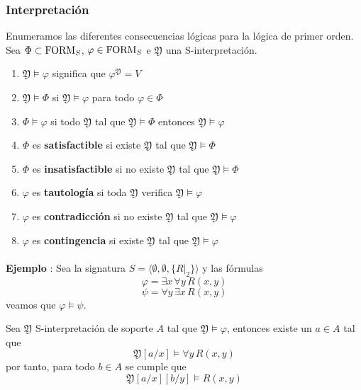\subsubsection{Interpretación}
\begin{definition}
Enumeramos las diferentes consecuencias lógicas para la lógica de primer orden. Sea $\Phi \subset \mbox{FORM}_{S}$, $\varphi \in \mbox{FORM}_{S}$ e $\mathfrak{Y}$ una S-interpretación. 
\begin{enumerate}
	\item $\mathfrak{Y} \models \varphi$ significa que $\varphi^{\mathfrak{Y}}=V$
	\item $\mathfrak{Y} \models \Phi$ si $\mathfrak{Y} \models \varphi$ para todo $\varphi \in \Phi$
	\item $\Phi \models \varphi$ si todo $\mathfrak{Y}$ tal que $\mathfrak{Y} \models \Phi$ entonces $\mathfrak{Y} \models \varphi$
	\item $\Phi$ es \textbf{satisfactible} si existe $\mathfrak{Y}$ tal que $\mathfrak{Y} \models \Phi$
    \item $\Phi$ es \textbf{insatisfactible} si no existe $\mathfrak{Y}$ tal que $\mathfrak{Y} \models \Phi$
    \item $\varphi$ es \textbf{tautología} si toda $\mathfrak{Y}$ verifica $\mathfrak{Y} \models \varphi$
    \item $\varphi$ es \textbf{contradicción} si no existe $\mathfrak{Y}$ tal que $\mathfrak{Y} \models \varphi$
    \item $\varphi$ es \textbf{contingencia} si existe $\mathfrak{Y}$ tal que $\mathfrak{Y} \models \varphi$
\end{enumerate} 
\end{definition}
\paragraph{}
\addtocounter{ej}{1} %
\textbf{Ejemplo }: Sea la signatura $S= \langle \emptyset, \emptyset, \{ R\vert_2\}\rangle$ y las fórmulas 
\begin{equation}
\varphi = \exists x \, \forall y \, R(x, y)
\end{equation}
\begin{equation}
\psi = \forall y \, \exists x \, R(x, y)
\end{equation}
veamos que $\varphi \models \psi$. 

Sea $\mathfrak{Y}$ S-interpretación de soporte $A$ tal que $\mathfrak{Y} \models \varphi$, entonces existe un $a \in A$ tal que 
\[ \mathfrak{Y}[a/x] \models \forall y \, R(x, y) \]
por tanto, para todo $b \in A$ se cumple que 
\[ \mathfrak{Y}[a/x][b/y] \models R(x, y) \] 

